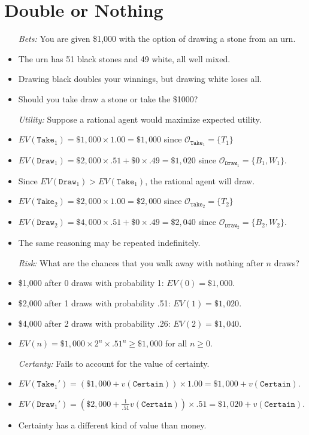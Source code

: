 \documentclass[a4paper, 11pt]{article} %
\newcommand{\set}[1]{\lbrace#1\rbrace} %
\renewcommand{\O}{\mathcal{O}}
\begin{document}
\section*{Double or Nothing}

\begin{itemize}
  \item[\it Bets:] You are given \$1,000 with the option of drawing a stone from an urn.
    \item The urn has 51 black stones and 49 white, all well mixed.
    \item Drawing black doubles your winnings, but drawing white loses all.
    \item Should you take draw a stone or take the \$1000?
  \item[\it Utility:] Suppose a rational agent would maximize expected utility.
    \item $EV(\texttt{Take}_1) = \$1,000 \times 1.00 = \$1,000$ since $\O_{\texttt{Take}_1}=\set{T_1}$ 
    \item $EV(\texttt{Draw}_1) = \$2,000 \times .51 + \$0 \times .49 = \$1,020$ since $\O_{\texttt{Draw}_1}=\set{B_1,W_1}$. 
    \item Since $EV(\texttt{Draw}_1) > EV(\texttt{Take}_1)$, the rational agent will draw.
    \item $EV(\texttt{Take}_2) = \$2,000 \times 1.00 = \$2,000$ since $\O_{\texttt{Take}_2}=\set{T_2}$ 
    \item $EV(\texttt{Draw}_2) = \$4,000 \times .51 + \$0 \times .49 = \$2,040$ since $\O_{\texttt{Draw}_2}=\set{B_2,W_2}$. 
    \item The same reasoning may be repeated indefinitely.
  \item[\it Risk:] What are the chances that you walk away with nothing after $n$ draws? 
    \item \$1,000 after 0 draws with probability 1: $EV(0) = \$1,000$.
    \item \$2,000 after 1 draws with probability .51: $EV(1) = \$1,020$.
    \item \$4,000 after 2 draws with probability .26: $EV(2) = \$1,040$.
    \item $EV(n) = \$1,000 \times 2^n \times .51^n \geq \$1,000$ for all $n \geq 0$.
  \item[\it Certanty:] Fails to account for the value of certainty.
    \item $EV(\texttt{Take}_1') = (\$1,000 + v(\texttt{Certain})) \times 1.00 = \$1,000 + v(\texttt{Certain})$.
    \item $EV(\texttt{Draw}_1') = (\$2,000 + \frac{1}{.51}v(\texttt{Certain})) \times .51 = \$1,020 + v(\texttt{Certain})$. 
    \item Certainty has a different kind of value than money.
\end{itemize}
\end{document}
